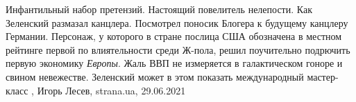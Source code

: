 Инфантильный набор претензий. Настоящий повелитель нелепости.  Как Зеленский
размазал канцлера.  Посмотрел поносик Блогера к будущему канцлеру Германии.
Персонаж, у которого в стране послица США обозначена в местном рейтинге первой
по влиятельности среди Ж-пола, решил поучительно подрючить первую экономику
\emph{Европы}. Жаль ВВП не измеряется в галактическом гоноре и свином
невежестве. Зеленский может в этом показать международный мастер-класс
, 
Игорь Лесев, strana.ua, 29.06.2021

